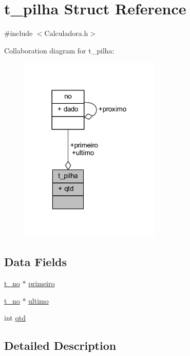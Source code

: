 \hypertarget{structt__pilha}{}\section{t\+\_\+pilha Struct Reference}
\label{structt__pilha}


{\ttfamily \#include $<$Calculadora.\+h$>$}



Collaboration diagram for t\+\_\+pilha\+:
\nopagebreak
\begin{figure}[H]
\begin{center}
\leavevmode
\includegraphics[width=189pt]{structt__pilha__coll__graph}
\end{center}
\end{figure}
\subsection*{Data Fields}
\begin{DoxyCompactItemize}
\item 
\mbox{\hyperlink{_calculadora_8h_a312f04dbe081fc59526dcf1463e3380a}{t\+\_\+no}} $\ast$ \mbox{\hyperlink{structt__pilha_a7934aefd2d1b991f40c0aee790cbe816}{primeiro}}
\item 
\mbox{\hyperlink{_calculadora_8h_a312f04dbe081fc59526dcf1463e3380a}{t\+\_\+no}} $\ast$ \mbox{\hyperlink{structt__pilha_ac877288312a8aa6ba82eed564f15e022}{ultimo}}
\item 
int \mbox{\hyperlink{structt__pilha_ab64e355d6f14927f41266ddfbf88ac91}{qtd}}
\end{DoxyCompactItemize}


\subsection{Detailed Description}


